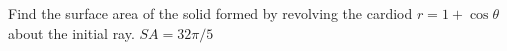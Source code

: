 {Find the surface area of the solid formed by revolving the cardiod $r=1+\cos\theta$ about the initial ray.
}
{$SA = 32\pi/5$
}
